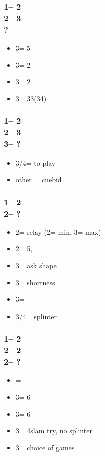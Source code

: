 \documentclass[12pt, a4paper]{article}
\begin{document}
\subsubsection*{1\nt -- 2\clubs\\
                2\diams -- 3\clubs\\
                ?}
\begin{itemize}
    \item 3\diams = 5\minor \qq
    \item 3\hearts = 2\spades
    \item 3\spades = 2\hearts
    \item 3\nt = 33(34)
\end{itemize}

\subsubsection*{1\nt -- 2\clubs\\
                2\diams -- 3\diams\\
                3\major -- ?}
\begin{itemize}
    \item 3\nt/4\major = to play
    \item other = cuebid
\end{itemize}

\subsubsection*{1\nt -- 2\clubs\\
                2\hearts -- ?}
\begin{itemize}
    \item 2\spades = relay (2\nt = min, 3\clubs = max)
    \item 2\nt = 5\spades, \inv
    \item 3\clubs = ask shape
    \item 3\diams = \minor shortness
    \item 3\hearts = \inv
    \item 3\spades/4\minor = splinter
\end{itemize}

\subsubsection*{1\nt -- 2\clubs\\
                2\hearts -- 2\spades\\
                2\nt -- ?}
\begin{itemize}
    \item \pass = \inv\ \bal
    \item 3\clubs = 6\spades\ \inv
    \item 3\diams = 6\spades\ \inv
    \item 3\hearts = 4\hearts slam try, no splinter
    \item 3\nt = choice of games
\end{itemize}
\end{document}
